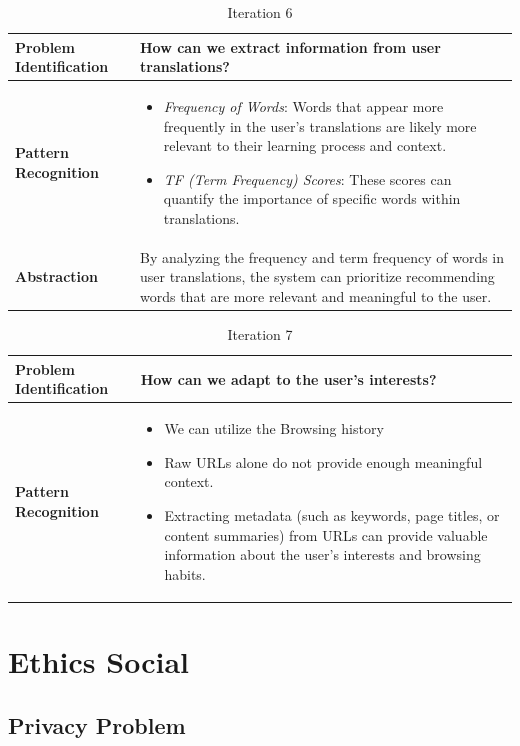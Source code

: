 \documentclass{article}
\begin{document}
\begin{table}[H]
\centering
\begin{tabular}{|p{}|p{}|}
\hline
\textbf{Problem Identification} 
&
How can we extract information from user translations?\\
\hline
\textbf{Pattern Recognition}
&
\begin{itemize}
\item \textit{Frequency of Words}: Words that appear more frequently in the user’s translations are likely more relevant to their learning process and context.
\item \textit{TF (Term Frequency) Scores}: These scores can quantify the importance of specific words within translations.
\end{itemize}
\\
\hline
\textbf{Abstraction}
&
By analyzing the frequency and term frequency of words in user translations, the system can prioritize recommending words that are more relevant and meaningful to the user.
\\
\hline
\end{tabular}
\caption{Iteration 6}
\label{table:ct-thinking-iter6}
\end{table}

\begin{table}[H]
\centering
\begin{tabular}{|p{}|p{}|}
\hline
\textbf{Problem Identification} 
&
How can we adapt to the user's interests?\\
\hline
\textbf{Pattern Recognition}
&
\begin{itemize}
\item We can utilize the Browsing history
\item Raw URLs alone do not provide enough meaningful context.
\item Extracting metadata (such as keywords, page titles, or content summaries) from URLs can provide valuable information about the user’s interests and browsing habits.
\end{itemize}
\\
\hline
\end{tabular}
\caption{Iteration 7}
\label{table:ct-thinking-iter7}
\end{table}

\section{Ethics Social}
\subsection{Privacy Problem}
\end{document}
